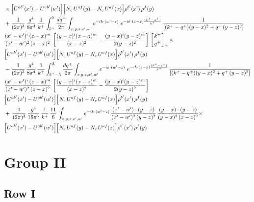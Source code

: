 \documentclass[9pt]{article}
\numberwithin{equation}{section}
\begin{document}
\begin{align}
&\times\Big[U^{ab'}(x')-U^{ab'}(w')\Big]\Big[N_{c}\,U^{af}(y)-N_{c}\,U^{af}(x)\Big]\rho^{b'}(x')\,\rho^{f}(y)\notag \\ & + \frac{1}{(2\pi)^{3}}\,\frac{g^{4}}{8\pi^{4}}\,\frac{1}{k^{+}}\int_{k^{+}}^{0}\frac{dq^{+}}{2\pi}\int_{x,y,z,x',w'}e^{-ik\cdot(w'-z)}\ e^{-ik\cdot(z-x)\frac{(k^{+}-q^{+})}{k^{+}}}\,\frac{1}{\left[(k^{+}-q^{+})(y-x)^{2}+q^{+}\,(y-z)^{2}\right]}\notag \\ & \frac{(x'-w')^{i}\,(z-x)^{m}}{(x'-w')^{2}\,(z-x)^{2}}\,\left[\frac{(y-x)^{i}(x-z)^{m}}{(x-z)^{2}}-\frac{(y-x)^{i}(y-z)^{m}}{2(y-z)^{2}}\right]\,\left[\frac{k^{+}}{q^{+}}\right]_{+}\times\notag \\ & \Big[U^{ab'}(x')-U^{ab'}(w')\Big]\Big[N_{c}\,U^{af}(y)-N_{c}\,U^{af}(x)\Big]\rho^{b'}(x')\,\rho^{f}(y)\notag \\ & - \frac{1}{(2\pi)^{3}}\,\frac{g^{4}}{8\pi^{4}}\,\frac{1}{k^{+}}\int_{k^{+}-\Lambda}^{\Lambda}\frac{dq^{+}}{2\pi}\int_{x,y,z,x',w'}e^{-ik\cdot(w'-z)}\ e^{-ik\cdot(z-x)\frac{(k^{+}-q^{+})}{k^{+}}}\,\frac{1}{\left[(k^{+}-q^{+})(y-x)^{2}+q^{+}\,(y-z)^{2}\right]}\notag \\ & \frac{(x'-w')^{i}\,(z-x)^{m}}{(x'-w')^{2}\,(z-x)^{2}}\,\left[\frac{(y-x)^{i}(x-z)^{m}}{(x-z)^{2}}-\frac{(y-x)^{i}(y-z)^{m}}{2(y-z)^{2}}\right]\notag \\ & \Big[U^{ab'}(x')-U^{ab'}(w')\Big]\Big[N_{c}\,U^{af}(y)-N_{c}\,U^{af}(x)\Big]\rho^{b'}(x')\,\rho^{f}(y)\notag \\ & +\, \frac{1}{(2\pi)^{3}}\,\frac{g^{4}}{16\pi^{5}}\,\frac{1}{k^{+}}\,\frac{11}{6}\,\int_{x,y,z,x',w'}e^{-ik\cdot(w'-z)}\, \frac{(x'-w')\cdot(y-z)}{(x'-w')^{2}\,(y-z)^{2}}\,\frac{(y-x)\cdot(y-z)}{(y-x)^{2}\,(x-z)^{2}}\times\notag \\ & \Big[U^{ab'}(x')-U^{ab'}(w')\Big]\Big[N_{c}\,U^{af}(y)-N_{c}\,U^{af}(z)\Big]\rho^{b'}(x')\,\rho^{f}(y)
\end{align}
\section{Group II}
\subsection{Row I}
\end{document}
